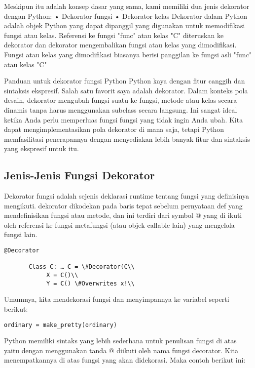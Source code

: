 \documentclass[12pt,a4paper]{article}
\begin{document}
Meskipun itu adalah konsep dasar yang sama, kami memiliki dua jenis dekorator dengan Python:
•	Dekorator fungsi
•	Dekorator kelas
Dekorator dalam Python adalah objek Python yang dapat dipanggil yang digunakan untuk memodifikasi fungsi atau kelas. Referensi ke fungsi "func" atau kelas "C" diteruskan ke dekorator dan dekorator mengembalikan fungsi atau kelas yang dimodifikasi. Fungsi atau kelas yang dimodifikasi biasanya berisi panggilan ke fungsi asli "func" atau kelas 
"C"


Panduan untuk dekorator fungsi Python
Python kaya dengan fitur canggih dan sintaksis ekspresif. Salah satu favorit saya adalah dekorator. Dalam konteks pola desain, dekorator mengubah fungsi suatu ke fungsi, metode atau kelas secara dinamis tanpa harus menggunakan subclass secara langsung. Ini sangat ideal ketika Anda perlu memperluas fungsi fungsi yang tidak ingin Anda ubah. Kita dapat mengimplementasikan pola dekorator di mana saja, tetapi Python memfasilitasi penerapannya dengan menyediakan lebih banyak fitur dan sintaksis yang ekspresif untuk itu.

\subsection{Jenis-Jenis Fungsi Dekorator}


Dekorator fungsi adalah sejenis deklarasi runtime tentang fungsi yang definisinya mengikuti. dekorator dikodekan pada baris tepat sebelum pernyataan def yang mendefinisikan fungsi atau metode, dan ini terdiri dari symbol @ yang di ikuti oleh referensi ke fungsi metafungsi (atau objek callable lain) yang mengelola fungsi lain.


\begin{verbatim}
@Decorator

       Class C: … C = \#Decorator(C\\
            X = C()\\
            Y = C() \#Overwrites x!\\
\end{verbatim}
            
Umumnya, kita mendekorasi fungsi dan menyimpannya ke variabel seperti berikut:
\begin{verbatim}
ordinary = make_pretty(ordinary)
\end{verbatim}

Python memiliki sintaks yang lebih sederhana untuk penulisan fungsi di atas yaitu dengan menggunakan tanda  @ diikuti oleh nama fungsi decorator. Kita menempatkannya di atas fungsi yang akan didekorasi. Maka contoh berikut ini:
\end{document}
